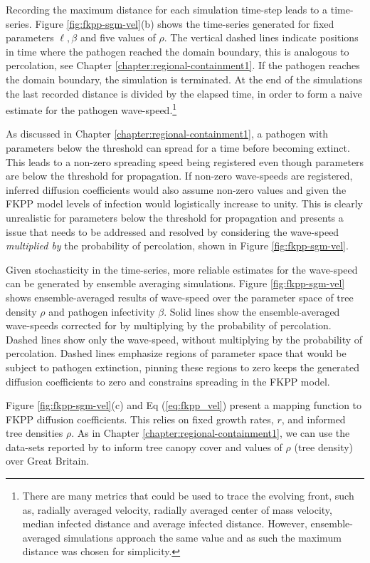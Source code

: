 Recording the maximum distance for each simulation time-step leads to a time-series. %
Figure \ref{fig:fkpp-sgm-vel}(b) shows the time-series generated for fixed parameters $\ell, \beta$ and five values of $\rho$. %
The vertical dashed lines indicate positions in time where the pathogen reached the domain boundary, this is analogous to percolation, see Chapter \ref{chapter:regional-containment1}. %
If the pathogen reaches the domain boundary, the  simulation is terminated. %
At the end of the simulations the last recorded distance is divided by the elapsed time, in order to form a naive estimate for the pathogen wave-speed.\footnote{There are many metrics that could be used to trace the evolving front, such as, radially averaged velocity, radially averaged center of mass velocity, median infected distance and average infected distance. However, ensemble-averaged simulations approach the same value and as such the maximum distance was chosen for simplicity.} %

As discussed in Chapter \ref{chapter:regional-containment1}, a pathogen with parameters below the threshold can spread for a time before becoming extinct. This leads to a non-zero spreading speed being registered even though parameters are below the threshold for propagation. %
If non-zero wave-speeds are registered, inferred diffusion coefficients would also assume non-zero values and given the FKPP model levels of infection would logistically increase to unity. %
This is clearly unrealistic for parameters below the threshold for propagation and presents a issue that needs to be addressed and  resolved by considering the wave-speed \textit{multiplied by} the probability of percolation, shown in Figure \ref{fig:fkpp-sgm-vel}. %

Given stochasticity in the time-series, more reliable estimates for the wave-speed can be generated by ensemble averaging simulations. %
Figure \ref{fig:fkpp-sgm-vel} shows ensemble-averaged results of wave-speed over the parameter space of tree density $\rho$ and pathogen infectivity $\beta$. %
Solid lines show the ensemble-averaged wave-speeds corrected for by multiplying by the probability of percolation. %
Dashed lines show only the wave-speed, without multiplying by the probability of percolation. Dashed lines emphasize regions of parameter space that would be subject to pathogen extinction, pinning these regions to zero keeps the generated diffusion coefficients to zero and constrains spreading in the FKPP model.

Figure \ref{fig:fkpp-sgm-vel}(c) and Eq (\ref{eq:fkpp_vel}) present a mapping function to FKPP diffusion coefficients. %
This relies on fixed growth rates, $r$, and informed tree densities $\rho$. %
As in Chapter \ref{chapter:regional-containment1}, we can use the data-sets reported by \cite{hill.data} to inform tree canopy cover and values of $\rho$ (tree density) over Great Britain. %

